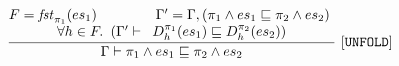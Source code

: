 \begin{gather*}
\frac{ \begin{matrix}
\text{{\tt{\ensuremath{F = \mathit{fst}_{{\pi_1}}(\textcolor{black}{{es}}_1)\qquad\qquad \Gamma^\prime = \Gamma,  (
{\pi_1} \wedge \textcolor{black}{{es}}_1 \sqsubseteq {\pi_2} \wedge \textcolor{black}{{es}}_2
)}}} }\\
    \text{{\tt{\ensuremath{\forall h\in F. \   (\Gamma^\prime  \vdash \   D_{h}^{{\pi_1}}( \textcolor{black}{{es}}_1) \sqsubseteq    D_{h}^{{\pi_2}}( \textcolor{black}{{es}}_2) )}}}}
  \end{matrix}}
   { \text{{\tt{\ensuremath{  \Gamma  \vdash {\pi_1} \wedge \textcolor{black}{{es}}_1 \sqsubseteq {\pi_2} \wedge \textcolor{black}{{es}}_2 }}}}}\  {\tt{\ensuremath{[UNFOLD]}}} 
\end{gather*}